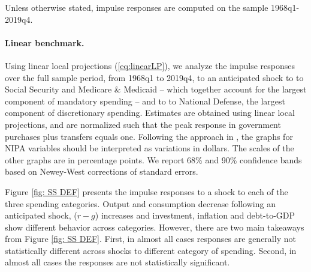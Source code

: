 \documentclass[12pt]{article}%
\theoremstyle{remark}
\begin{document}
Unless otherwise stated, impulse responses are computed on the sample 1968q1-2019q4.

\paragraph{Linear benchmark.} Using linear local projections (\ref{eq:linearLP}), we analyze the impulse responses over the full sample period, from 1968q1 to 2019q4, to an anticipated shock to to Social Security and Medicare \& Medicaid  -- which together account for the largest component of mandatory spending -- and to to National Defense, the largest component of discretionary spending. Estimates are obtained using linear local projections, and are normalized such that the peak response in government purchases plus transfers equals one. Following the approach in \citet{Ramey2016}, the graphs for NIPA variables should be interpreted as variations in dollars. %
The scales of the other graphs are in percentage points. We report 68\% and 90\% confidence bands based on Newey-West corrections of standard errors.

Figure  \ref{fig: SS DEF} presents the impulse responses to a shock to each of the three spending categories. 
Output and consumption decrease following an anticipated shock, ($r-g$) increases and  investment, inflation and debt-to-GDP show different behavior across categories. 
However, there are two main takeaways from Figure  \ref{fig: SS DEF}. First, in almost all cases responses are generally not statistically different across shocks to different category of spending. Second, in almost all cases the responses are not statistically significant. 


\end{document}
